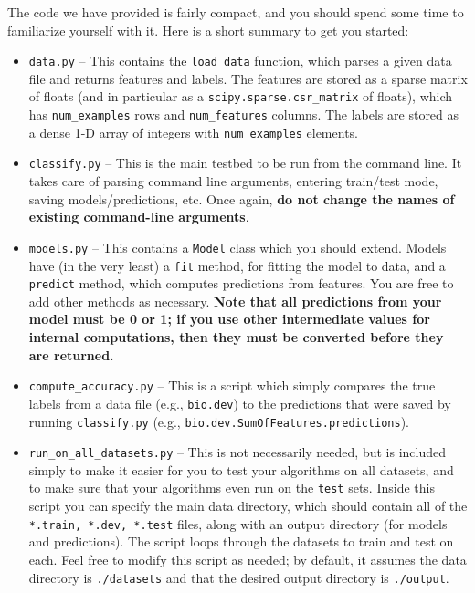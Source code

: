 \documentclass[11pt]{article}
\begin{document}
	The code we have provided is fairly compact, and you should spend some time to familiarize yourself with it. Here is a short summary to get you started:
	\begin{itemize}
		\item \texttt{data.py} -- This contains the \texttt{load\_data} function, which parses a given data file and returns features and labels. The features are stored as a sparse matrix of floats (and in particular as a \texttt{scipy.sparse.csr\_matrix} of floats), which has \texttt{num\_examples} rows and \texttt{num\_features} columns. The labels are stored as a dense 1-D array of integers with \texttt{num\_examples} elements.
		\item \texttt{classify.py} -- This is the main testbed to be run from the command line. It takes care of parsing command line arguments, entering train/test mode, saving models/predictions, etc. Once again, \textbf{do not change the names of existing command-line arguments}.
		\item \texttt{models.py} -- This contains a \texttt{Model} class which you should extend. Models have (in the very least) a \texttt{fit} method, for fitting the model to data, and a \texttt{predict} method, which computes predictions from features. You are free to add other methods as necessary. \textbf{Note that all predictions from your model must be 0 or 1; if you use other intermediate values for internal computations, then they must be converted before they are returned.}
		\item \texttt{compute\_accuracy.py} -- This is a script which simply compares the true labels from a data file (e.g., \texttt{bio.dev}) to the predictions that were saved by running \texttt{classify.py} (e.g., \texttt{bio.dev.SumOfFeatures.predictions}).
		\item \texttt{run\_on\_all\_datasets.py} -- This is not necessarily needed, but is included simply to make it easier for you to test your algorithms on all datasets, and to make sure that your algorithms even run on the \texttt{test} sets. Inside this script you can specify the main data directory, which should contain all of the \texttt{*.train, *.dev, *.test} files, along with an output directory (for models and predictions). The script loops through the datasets to train and test on each. Feel free to modify this script as needed; by default, it assumes the data directory is \texttt{./datasets} and that the desired output directory  is \texttt{./output}.
	\end{itemize}
	
\end{document}
